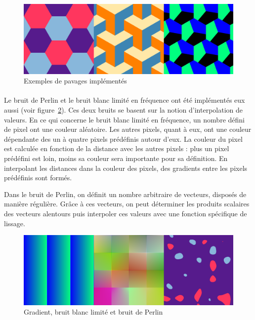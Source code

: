 \documentclass[a4paper]{article}
\begin{document}
\begin{figure}
    \centering
    \includegraphics[width=0.8\columnwidth]{tilings.png}
    \caption{Exemples de pavages implémentés}
    \label{fig:tilings}
\end{figure}

\paragraph{}
Le bruit de Perlin et le bruit blanc limité en fréquence ont été implémentés eux aussi (voir figure~\ref{fig:noises}). Ces deux bruits se basent sur la notion d'interpolation de valeurs. En ce qui concerne le bruit blanc limité en fréquence, un nombre défini de pixel ont une couleur aléatoire. Les autres pixels, quant à eux, ont une couleur dépendante des un à quatre pixels prédéfinis autour d'eux. La couleur du pixel est calculée en fonction de la distance avec les autres pixels : plus un pixel prédéfini est loin, moins sa couleur sera importante pour sa définition. En interpolant les distances dans la couleur des pixels, des gradients entre les pixels prédéfinis sont formés.

Dans le bruit de Perlin, on définit un nombre arbitraire de vecteurs, disposés de manière régulière. Grâce à ces vecteurs, on peut déterminer les produits scalaires des vecteurs alentours puis interpoler ces valeurs avec une fonction spécifique de lissage.


\begin{figure}
    \centering
    \includegraphics[width=0.8\columnwidth]{noises.png}
    \caption{Gradient, bruit blanc limité et bruit de Perlin}
    \label{fig:noises}
\end{figure}
\end{document}
